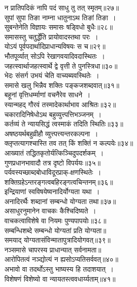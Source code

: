 {{{{\begin{center}
 न प्रातिपदिकं नापि पदं साधु तु तत् स्मृतम्॥२७॥\\[10pt]
 सुपां सुपा तिङा नाम्ना धातुनाऽथ तिङां तिङा~।\\
 सुबन्तेनेति विज्ञायः समासः षड्विधो बुधैः॥२८॥\\[10pt]
 समासस्तु चतुर्द्धेति प्रायोवादस्तथा परः~।\\
 योऽयं पूर्वपदार्थादिप्राधान्यविषयः स च॥२९॥\\[10pt]
भौतपूर्व्यात् सोऽपि रेखागवयादिवदास्थितः~।\\
जहत्स्वार्थाजहत्स्वार्थे द्वे वृत्ती ते पुनस्त्रिधा॥३०॥\\[10pt]
 भेदः संसर्ग उभयं चेति वाच्यब्यवस्थितेः~।\\
समासे खलु भिन्नैव शक्तिः पङ्कजशब्दवात्॥३१॥\\[10pt]
 बहूनां वृत्तिधर्म्माणां वचनैरेव साधने~।\\
 स्यान्महद् गौरवं तस्मादेकार्थाभाव आश्रितः॥३२॥\\[10pt]
चकारादिनिषेधोऽथ बहुव्युत्त्पत्तिभञ्जनम्~।\\
कर्तव्यं ते न्यायसिद्धं त्वस्माकं तदिति स्थितिः॥३३॥\\
 अषष्ठयर्थबहुव्रीहौ व्युत्त्पत्त्यन्तरकल्पना~।\\
 क्लृप्तत्यागश्चास्ति तव तत् किं शक्तिं न कल्पयेः॥३४॥\\[10pt]
 आख्यातं तद्धितकृतोर्यत्किञ्चिदुपदर्शकम्~।\\
 गुणप्रधानभावादौ तत्र दृष्टो विपर्ययः॥३५॥\\[10pt]
 पर्यवस्यच्छाब्दबोधाविदूरप्राक्-क्षणस्थितेः~।\\
 शक्तिग्रहेऽन्तरङ्गत्वबहिरङ्गत्वचिन्तनम्॥३६॥\\[10pt]
 इन्द्रियाणां स्वविषयेष्वनादिर्योग्यता यथा~।\\
 अनादिरर्थैः शब्दानां सम्बन्धो योग्यता तथा॥३७॥\\[10pt]
 असाधुरनुमानेन वाचकः कैश्चिदिष्यते~।\\
 वाचकत्वाविशेषे वा नियमः पुण्यपापयोः॥३८॥\\[10pt]
 सम्बन्धिशब्दे सम्बन्धो योग्यतां प्रति योग्यता॥\\[10pt]
 समयाद् योग्यतासंविन्मातापुत्रादियोगवत्॥३९॥\\[10pt]
 नञ्समासे चापरस्य प्राधान्यात् सर्वनामता॥\\[10pt]
 आरोपितत्वं नञ्द्योत्यं न ह्यसोऽप्यतिसर्ववत्॥४०॥\\[10pt]
 अभावो वा तदर्थोऽस्तु भाष्यस्य हि तदाशयात्~।\\
 विशेषणं विशेष्यो वा न्यायतस्त्ववधार्य्यताम्॥४१॥\\[10pt]

\end{center}}}}}
